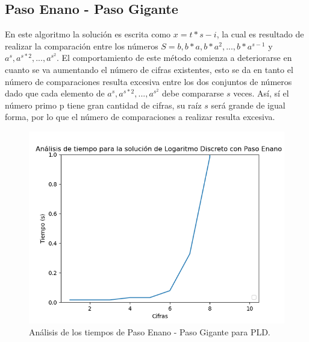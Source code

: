 \documentclass{article}
\begin{document}
    \subsection{Paso Enano - Paso Gigante}
    En este algoritmo la solución es escrita como \begin{math}x=t*s-i\end{math}, la cual es resultado de realizar la comparación entre los números \begin{math}S={b,b*a,b*a^2,...,b*a^{s-1}}\end{math} y \begin{math}{a^s,a^{s*2},...,a^{s^2}}\end{math}. El comportamiento de este método comienza a deteriorarse en cuanto se va aumentando el número de cifras existentes, esto se da en tanto el número de comparaciones resulta excesiva entre los dos conjuntos de números dado que cada elemento de \begin{math}{a^s,a^{s*2},...,a^{s^2}}\end{math} debe compararse \begin{math}{s}\end{math} veces.
    \newblock
    Así, sí el número primo p tiene gran cantidad de cifras, su raíz \begin{math}{s}\end{math} será grande de igual forma, por lo que el número de comparaciones a realizar resulta excesiva.
     \begin{figure}[ht!]
        \centering
        \includegraphics[scale=0.7]{Figure_8}
        \caption{Análisis de los tiempos de Paso Enano - Paso Gigante para PLD.}
        \label{fig:Figure_6}
    \end{figure}
    \newpage
    
\end{document}
